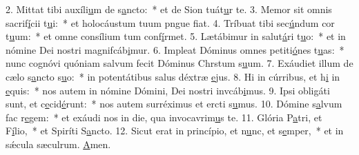 2. Mittat tibi auxíli\uline{u}m de s\uline{a}ncto:~* et de Sion tuát\uline{u}r te.
3. Memor sit omnis sacrif\uline{í}cii t\uline{u}i:~* et holocáustum tuum pngue f\uline{i}at.
4. Tríbuat tibi sec\uline{ú}ndum cor t\uline{u}um:~* et omne consílium tum conf\uline{í}rmet.
5. Lætábimur in salut\uline{á}ri t\uline{u}o:~* et in nómine Dei nostri magnifcáb\uline{i}mur.
6. Impleat Dóminus omnes petiti\uline{ó}nes t\uline{u}as:~* nunc cognóvi quóniam salvum fecit Dóminus Chrstum s\uline{u}um.
7. Exáudiet illum de cælo s\uline{a}ncto s\uline{u}o:~* in potentátibus salus déxtræ \uline{e}jus.
8. Hi in cúrribus, et h\uline{i} in \uline{e}quis:~* nos autem in nómine Dómini, Dei nostri invcáb\uline{i}mus.
9. Ipsi obligáti sunt, et c\uline{e}cid\uline{é}runt:~* nos autem surréximus et ercti s\uline{u}mus.
10. Dómine s\uline{a}lvum fac r\uline{e}gem:~* et exáudi nos in die, qua invocavrim\uline{u}s te.
11. Glória P\uline{a}tri, et F\uline{í}lio,~* et Spiríti S\uline{a}ncto.
12. Sicut erat in princípio, et n\uline{u}nc, et s\uline{e}mper,~* et in sǽcula sæculrum. \uline{A}men.
